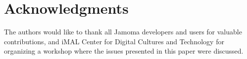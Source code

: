 \documentclass{NIME-alternate}
\begin{document}

\section{Acknowledgments} %
\label{sec:acknowledgments}

The authors would like to thank all Jamoma developers and users for valuable contributions, and iMAL Center for Digital Cultures and Technology for organizing a workshop where the issues presented in this paper were discussed.





%
\begin{small}

\end{small}
%


\balancecolumns %
\end{document}
